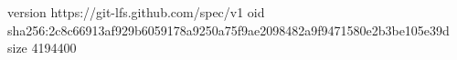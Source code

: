 version https://git-lfs.github.com/spec/v1
oid sha256:2c8c66913af929b6059178a9250a75f9ae2098482a9f9471580e2b3be105e39d
size 4194400
